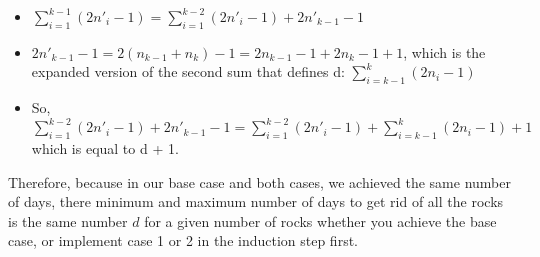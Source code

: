 \documentclass[12pt]{article}
\begin{document}
\begin{enumerate}
\begin{enumerate}
\begin{itemize}
\begin{itemize}
                \begin{itemize}
                  \item ${\sum_{i=1}^{k-1} (2n'_i -1) = \sum_{i=1}^{k-2} (2n'_i -1) + 2n'_{k-1} -1}$
                  \item ${2n'_{k-1} -1 = 2(n_{k-1} + n_k) - 1 = 2n_{k-1} - 1+ 2n_k - 1 + 1}$, which is the expanded version of the second sum that defines d: ${\sum_{i=k-1}^k (2n_i -1)}$
                  \item So, ${\sum_{i=1}^{k-2} (2n'_i -1) + 2n'_{k-1} -1 = \sum_{i=1}^{k-2} (2n'_i - 1) + \sum_{i=k-1}^{k} (2n_i -1) + 1}$ which is equal to d + 1.
                \end{itemize}
            \end{itemize}
        \end{itemize}
        Therefore, because in our base case and both cases, we achieved the same number of days, there minimum and maximum number of days to get rid of all the rocks is the same number $d$ for a given number of rocks whether you achieve the base case, or implement case 1 or 2 in the induction step first.
    \end{enumerate}
\end{enumerate}
\end{document}
